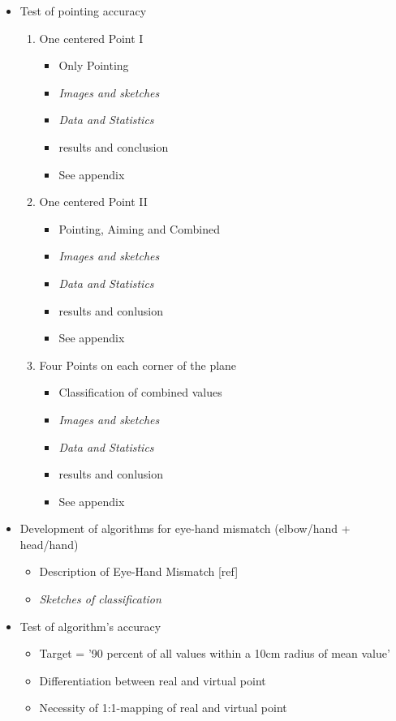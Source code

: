 \begin{itemize}
	\item Test of pointing accuracy
	\begin{enumerate}
		\item One centered Point I
		\begin{itemize}
			\item Only Pointing
			\item \textit{Images and sketches}
			\item \textit{Data and Statistics}
			\item results and conclusion
			\item See appendix
		\end{itemize}
		\item One centered Point II
		\begin{itemize}
			\item Pointing, Aiming and Combined
			\item \textit{Images and sketches}
			\item \textit{Data and Statistics}
			\item results and conlusion
			\item See appendix
		\end{itemize}
		\item Four Points on each corner of the plane
		\begin{itemize}
			\item Classification of combined values
			\item \textit{Images and sketches}
			\item \textit{Data and Statistics}
			\item results and conlusion
			\item See appendix
		\end{itemize}
	\end{enumerate}
	\item Development of algorithms for eye-hand mismatch (elbow/hand + head/hand)
	\begin{itemize}
		\item Description of Eye-Hand Mismatch [ref]
		\item \textit{Sketches of classification}
	\end{itemize}
	\item Test of algorithm's accuracy
	\begin{itemize}
		\item Target = '90 percent of all values within a 10cm radius of mean value'
		\item Differentiation between real and virtual point
		\item Necessity of 1:1-mapping of real and virtual point
	\end{itemize}
\end{itemize}

